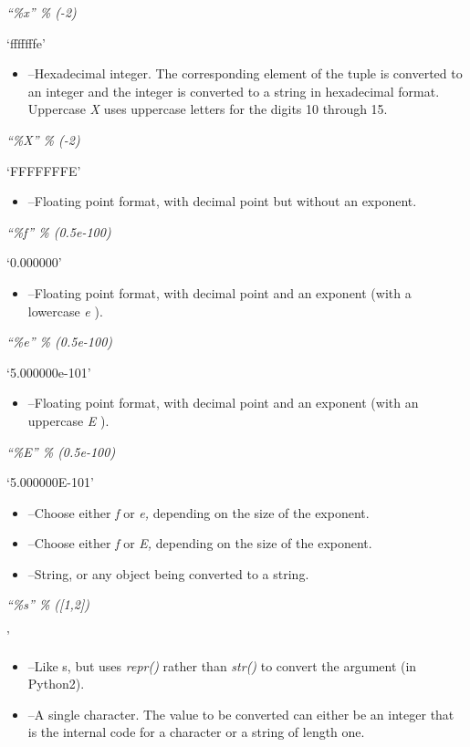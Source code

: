 \emph{``\%x'' \% (-2)}

`fffffffe'

\begin{itemize}
\tightlist
\item
   --Hexadecimal integer.
  The corresponding element of the tuple is converted to an integer and
  the integer is converted to a string in hexadecimal format. Uppercase
  \emph{X} uses uppercase letters for the digits 10 through 15.
\end{itemize}


\emph{``\%X'' \% (-2)}

`FFFFFFFE'

\begin{itemize}
\tightlist
\item
   --Floating point
  format, with decimal point but without an exponent.
\end{itemize}


\emph{``\%f'' \% (0.5e-100)}

`0.000000'

\begin{itemize}
\tightlist
\item
   --Floating point
  format, with decimal point and an exponent (with a lowercase \emph{e}
  ).
\end{itemize}


\emph{``\%e'' \% (0.5e-100)}

`5.000000e-101'

\begin{itemize}
\tightlist
\item
   --Floating point
  format, with decimal point and an exponent (with an uppercase \emph{E}
  ).
\end{itemize}


\emph{``\%E'' \% (0.5e-100)}

`5.000000E-101'

\begin{itemize}
\tightlist
\item
   --Choose either
  \emph{f} or \emph{e,} depending on the size of the exponent.
\item
   --Choose either
  \emph{f} or \emph{E,} depending on the size of the exponent.
\item
   --String, or any object
  being converted to a string.
\end{itemize}


\emph{``\%s'' \% ({[}1,2{]})}

'

\begin{itemize}
\tightlist
\item
   --Like s, but uses
  \emph{repr()} rather than \emph{str()} to convert the argument (in
  Python2).
\item
   --A single character.
  The value to be converted can either be an integer that is the
  internal code for a character or a string of length one.
\end{itemize}


